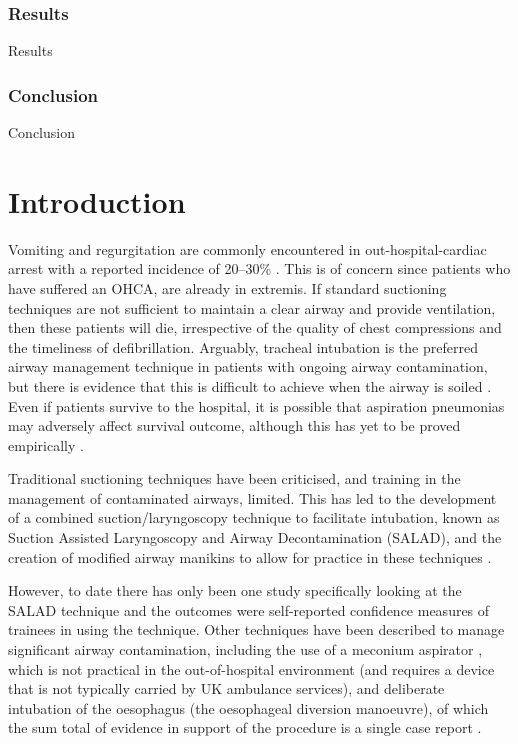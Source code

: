 \documentclass[]{article}
\begin{document}
\hypertarget{results}{%
\subsubsection{Results}\label{results}}

Results

\hypertarget{conclusion}{%
\subsubsection{Conclusion}\label{conclusion}}

Conclusion

\hypertarget{intro}{%
\section{Introduction}\label{intro}}

Vomiting and regurgitation are commonly encountered in
out-hospital-cardiac arrest with a reported incidence of 20--30\%
\citep{voss_how_2014, simons_incidence_2007}. This is of concern since
patients who have suffered an OHCA, are already in extremis. If standard
suctioning techniques are not sufficient to maintain a clear airway and
provide ventilation, then these patients will die, irrespective of the
quality of chest compressions and the timeliness of defibrillation.
Arguably, tracheal intubation is the preferred airway management
technique in patients with ongoing airway contamination, but there is
evidence that this is difficult to achieve when the airway is soiled
\citep{sakles_impact_2017}. Even if patients survive to the hospital, it
is possible that aspiration pneumonias may adversely affect survival
outcome, although this has yet to be proved empirically
\citep{christ_early-onset_2016}.

Traditional suctioning techniques have been criticised, and training in
the management of contaminated airways, limited. This has led to the
development of a combined suction/laryngoscopy technique to facilitate
intubation, known as Suction Assisted Laryngoscopy and Airway
Decontamination (SALAD), and the creation of modified airway manikins to
allow for practice in these techniques \citep{ducanto_novel_2017}.

However, to date there has only been one study specifically looking at
the SALAD technique and the outcomes were self-reported confidence
measures of trainees in using the technique. Other techniques have been
described to manage significant airway contamination, including the use
of a meconium aspirator \citep{kei_comparing_2017}, which is not
practical in the out-of-hospital environment (and requires a device that
is not typically carried by UK ambulance services), and deliberate
intubation of the oesophagus (the oesophageal diversion manoeuvre), of
which the sum total of evidence in support of the procedure is a single
case report \citep{kornhall_intentional_2015}.
\end{document}
